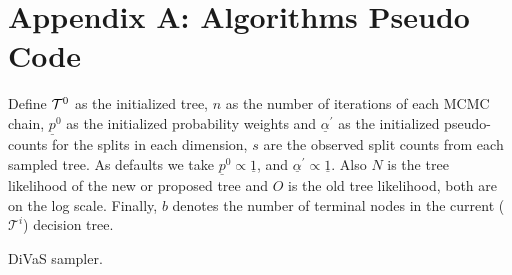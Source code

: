 
\section*{Appendix A:  Algorithms Pseudo Code}
Define $\small{\mathcal{T}^0}$ as the initialized tree, $n$ as the number of iterations of each MCMC chain, $\underline{p}^0$ as the initialized probability weights and $\underline{\alpha}^\prime$ as the initialized pseudo-counts for the splits in each dimension, $s$ are the observed split counts from each sampled tree. As defaults we take $\underline{p}^0\propto \underline{1}$, and  $\underline{\alpha}^\prime \propto \underline{1}$. Also $N$ is the tree likelihood of the new or proposed tree and $O$ is the old tree likelihood, both are on the log scale. Finally, $b$ denotes the number of terminal nodes in the current ($\mathcal{T}^i$) decision tree. 

\begin{algorithm}[H]
\caption{DiVaS sampler.}\label{psd:DiVaS_sampler}
			\end{algorithm}

